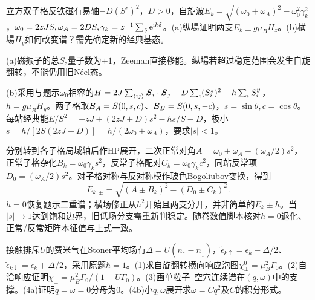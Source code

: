 \begin{exercise}[原题2(a)--(b)]\label{p:512-11-2}
立方双子格反铁磁有易轴$-D(S^z)^2$，$D>0$，自旋波$E_k=\sqrt{(\omega_0+\omega_A)^2-\omega_0^2\gamma_k^2}$，$\omega_0=2zJS,\omega_A=2DS,\gamma_k=z^{-1}\sum_\delta\mathrm e^{\mathrm i k\delta}$。(a)纵場证明两支$E_k\pm g\mu_BH_z$。(b)横場$H_y$如何改变谱？需先确定新的经典基态。
\end{exercise}
\begin{solution}
(a)磁振子的总$S_z$量子数为$\pm1$，Zeeman直接移能。纵場若超过稳定范围会发生自旋翻转，不能仍用旧Néel态。

(b)采用与题示$\omega_0$相容的$H=2J\sum_{\langle ij\rangle}\boldsymbol{S}_i\cdot\boldsymbol{S}_j-D\sum_i(S_i^z)^2-h\sum_iS_i^y$，$h=g\mu_BH_y$。两子格取$\boldsymbol{S}_A=S(0,s,c)$、$\boldsymbol{S}_B=S(0,s,-c)$，$s=\sin\theta,c=\cos\theta$。每站经典能$E/S^2=-zJ+(2zJ+D)s^2-hs/S-D$，极小$s=h/[2S(2zJ+D)]=h/(2\omega_0+\omega_A)$，要求$|s|<1$。

分别转到各子格局域轴后作HP展开，二次正常对角$A=\omega_0+\omega_A-(\omega_A/2)s^2$，正常子格杂化$B_k=\omega_0\gamma_ks^2$，反常子格配对$C_k=\omega_0\gamma_kc^2$，同站反常项$D_0=(\omega_A/2)s^2$。对子格对称与反对称模作玻色Bogoliubov变换，得到
\begin{equation}
E_{k,\pm}=\sqrt{(A\pm B_k)^2-(D_0\pm C_k)^2}.
\end{equation}
$h=0$恢复题示二重谱；横场修正从$h^2$开始且两支分开，并非简单的$E_k\pm h$。当$|s|\to1$达到饱和边界，旧低场分支需重新判稳定。随卷数值脚本核对$h=0$退化、正常/反常矩阵本征值与上式一致。
\end{solution}
\begin{exercise}[原题1--4(a)--(b)]\label{p:512-12-1}
接触排斥$U$的费米气在Stoner平均场有$\Delta=U(n_\uparrow-n_\downarrow)$，$\widetilde\epsilon_{k\uparrow}=\epsilon_k-\Delta/2$、$\widetilde\epsilon_{k\downarrow}=\epsilon_k+\Delta/2$，采用原题$\hbar=1$。(1)求自旋翻转横向响应泡图$\chi_\perp^0=\mu_B^2\Gamma_0$。(2)自洽响应证明$\chi_\perp=\mu_B^2\Gamma_0/(1-U\Gamma_0)$。(3)画单粒子--空穴连续谱在$(q,\omega)$中的支撑。(4a)证明$q=\omega=0$分母为0。(4b)小$q,\omega$展开求$\omega=Cq^2$及$C$的积分形式。
\end{exercise}
